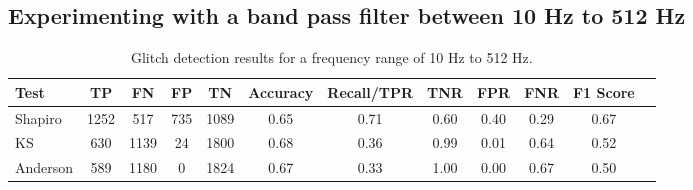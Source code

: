 \documentclass[12pt]{article}
\begin{document}
\subsection{Experimenting with a band pass filter between 10 Hz to 512 Hz}\label{Experiment_2}

\begin{table}[H]
  \centering
  \begin{tabular}{lccccccccccc}
  \toprule
  Test & TP & FN & FP & TN & Accuracy & Recall/TPR & TNR & FPR & FNR & F1 Score \\
  \midrule
  Shapiro & 1252 & 517 & 735 & 1089 & 0.65 & 0.71 & 0.60 & 0.40 & 0.29 & 0.67 \\
  KS & 630 & 1139 & 24 & 1800 & 0.68 & 0.36 & 0.99 & 0.01 & 0.64 & 0.52 \\
  Anderson & 589 & 1180 & 0 & 1824 & 0.67 & 0.33 & 1.00 & 0.00 & 0.67 & 0.50 \\
  \bottomrule
  \end{tabular}
  \caption{Glitch detection results for a frequency range of 10 Hz to 512 Hz.}
  \label{tab:low_frequency_results}
\end{table}
\end{document}
